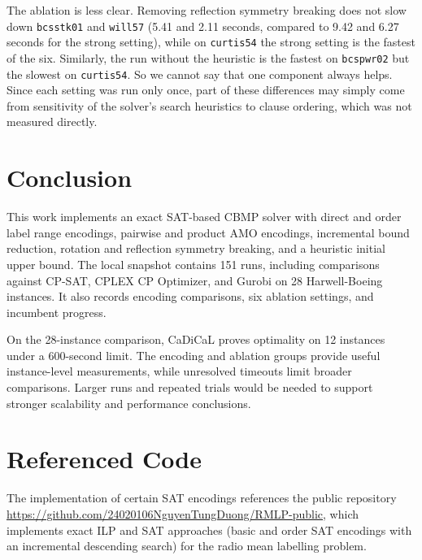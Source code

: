 \documentclass[a4paper,fleqn]{cas-sc}
\begin{document}
        The ablation is less clear. Removing reflection symmetry breaking does not slow down \texttt{bcsstk01} and \texttt{will57} (5.41 and 2.11 seconds, compared to 9.42 and 6.27 seconds for the strong setting), while on \texttt{curtis54} the strong setting is the fastest of the six. Similarly, the run without the heuristic is the fastest on \texttt{bcspwr02} but the slowest on \texttt{curtis54}. So we cannot say that one component always helps. Since each setting was run only once, part of these differences may simply come from sensitivity of the solver's search heuristics to clause ordering, which was not measured directly.

\section{Conclusion}

    This work implements an exact SAT-based CBMP solver with direct and order label range encodings, pairwise and product AMO encodings, incremental bound reduction, rotation and reflection symmetry breaking, and a heuristic initial upper bound. The local snapshot contains 151 runs, including comparisons against CP-SAT, CPLEX CP Optimizer, and Gurobi on 28 Harwell-Boeing instances. It also records encoding comparisons, six ablation settings, and incumbent progress.

    On the 28-instance comparison, CaDiCaL proves optimality on 12 instances under a 600-second limit. The encoding and ablation groups provide useful instance-level measurements, while unresolved timeouts limit broader comparisons. Larger runs and repeated trials would be needed to support stronger scalability and performance conclusions.


\nocite{*}


\section*{Referenced Code}
    The implementation of certain SAT encodings references the public repository \url{https://github.com/24020106NguyenTungDuong/RMLP-public}, which implements exact ILP and SAT approaches (basic and order SAT encodings with an incremental descending search) for the radio mean labelling problem.
\end{document}
